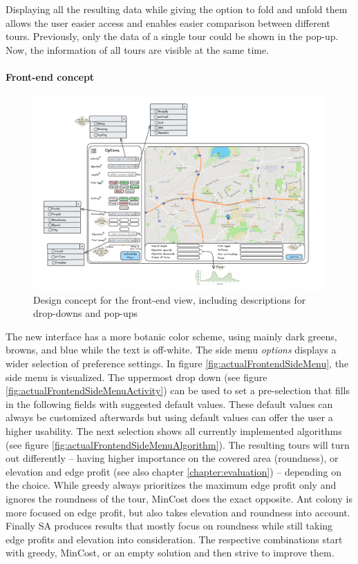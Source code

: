 Displaying all the resulting data while giving the option to fold and unfold them allows the user easier access and enables easier comparison between different tours.
Previously, only the data of a single tour could be shown in the pop-up. 
Now, the information of all tours are visible at the same time. 

\paragraph{Front-end concept}

\begin{figure}[H]
	\centering
	\includegraphics[width=0.9\linewidth]{bilder/Concept new Frontend design.png}
	\caption{Design concept for the front-end view, including descriptions for drop-downs and pop-ups}
	\label{fig:frontendConcept}
\end{figure}



The new interface has a more botanic color scheme, using mainly dark greens, browns, and blue while the text is off-white.
The side menu \textit{options} displays a wider selection of preference settings.
In figure \ref{fig:actualFrontendSideMenu}, the side menu is visualized. 
The uppermost drop down (see figure \ref{fig:actualFrontendSideMenuActivity}) can be used to set a pre-selection that fills in the following fields with suggested default values. 
These default values can always be customized afterwards but using default values can offer the user a higher usability.
The next selection shows all currently implemented algorithms (see figure \ref{fig:actualFrontendSideMenuAlgorithm}).
The resulting tours will turn out differently -- having higher importance on the covered area (roundness), or elevation and edge profit (see also chapter \ref{chapter:evaluation}) -- depending on the choice.
While greedy always prioritizes the maximum edge profit only and ignores the roundness of the tour, MinCost does the exact opposite.
Ant colony is more focused on edge profit, but also takes elevation and roundness into account.
Finally SA produces results that mostly focus on roundness while still taking edge profits and elevation into consideration. 
The respective combinations start with greedy, MinCost, or an empty solution and then strive to improve them. 


